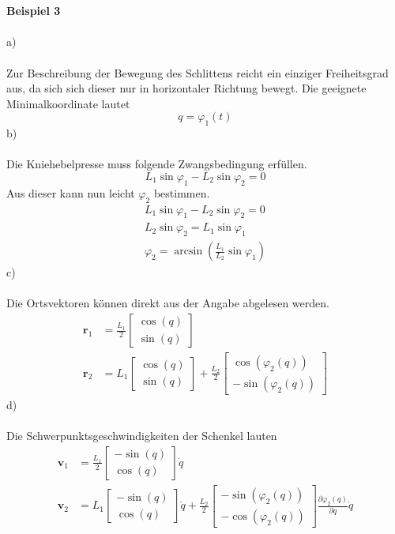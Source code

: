 \\ \\
\textbf{Beispiel 3} \\ \\
a)\\ \\
Zur Beschreibung der Bewegung des Schlittens reicht ein einziger Freiheitsgrad aus, da sich sich dieser nur in horizontaler Richtung bewegt. Die geeignete Minimalkoordinate lautet
\[
	q = \varphi_1(t)
\]
b) \\ \\
Die Kniehebelpresse muss folgende Zwangsbedingung erfüllen.
\[
	L_1\sin\varphi_1 - L_2\sin\varphi_2 = 0
\]
Aus dieser kann nun leicht $\varphi_2$ bestimmen.
\begin{align*}
	L_1\sin\varphi_1 - L_2\sin\varphi_2 = 0  \\
	L_2\sin\varphi_2 = L_1\sin\varphi_1 \\
	\varphi_2 = \arcsin\left(\frac{L_1}{L_2}\sin\varphi_1\right)
\end{align*}
c) \\ \\
Die Ortsvektoren können direkt aus der Angabe abgelesen werden.
\begin{align*}
	\textbf{r}_1 &= \frac{L_1}{2}\begin{bmatrix}
		\cos(q) \\
		\sin(q)
	\end{bmatrix} 
	\\
	\textbf{r}_2 &= L_1\begin{bmatrix}
	\cos(q) \\
	\sin(q)
	\end{bmatrix} 
	+ 
	\frac{L_2}{2}\begin{bmatrix}
		\cos(\varphi_2(q)) \\
		-\sin(\varphi_2(q))
	\end{bmatrix}
\end{align*}
d) \\ \\
Die Schwerpunktsgeschwindigkeiten der Schenkel lauten
\begin{align*}
	\textbf{v}_1 &= \frac{L_1}{2}\begin{bmatrix}
		-\sin(q) \\
		 \cos(q)
	\end{bmatrix} \dot{q}
	\\
	\textbf{v}_2 &= L_1 \begin{bmatrix}
	-\sin(q) \\
	\cos(q)
	\end{bmatrix} \dot{q}
	+
	\frac{L_2}{2}\begin{bmatrix}
		-\sin(\varphi_2(q)) \\
		-\cos(\varphi_2(q))
	\end{bmatrix}
	\frac{\partial \varphi_2(q)}{\partial q} \dot{q}
\end{align*}
